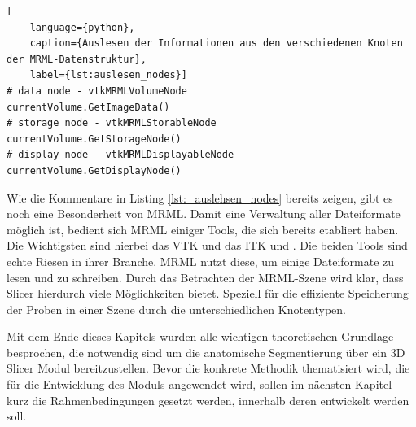 \pagebreak

\begin{lstlisting}[
	language={python},
	caption={Auslesen der Informationen aus den verschiedenen Knoten der MRML-Datenstruktur},
	label={lst:auslesen_nodes}]
# data node - vtkMRMLVolumeNode
currentVolume.GetImageData()
# storage node - vtkMRMLStorableNode
currentVolume.GetStorageNode()
# display node - vtkMRMLDisplayableNode
currentVolume.GetDisplayNode()
\end{lstlisting}

Wie die Kommentare in Listing \ref{lst:_auslehsen_nodes} bereits zeigen, gibt es
noch eine Besonderheit von \ac{MRML}. Damit eine Verwaltung aller Dateiformate
möglich ist, bedient sich \ac{MRML} einiger Tools, die sich bereits etabliert haben.
Die Wichtigsten sind hierbei das \ac{VTK} und das \ac{ITK} \citep[vgl.][K.~1.1]{vtk2006}
und \citep[vgl.][K.~1.1]{itkguide2015}. Die beiden Tools sind echte Riesen in ihrer
Branche. \ac{MRML} nutzt diese, um einige Dateiformate zu lesen und zu schreiben.
Durch das Betrachten der \ac{MRML}-Szene wird klar, dass Slicer hierdurch viele Möglichkeiten
bietet. Speziell für die effiziente Speicherung der Proben in einer Szene durch
die unterschiedlichen Knotentypen.

Mit dem Ende dieses Kapitels wurden alle wichtigen theoretischen Grundlage
besprochen, die notwendig sind um die anatomische Segmentierung über ein 3D Slicer
Modul bereitzustellen. Bevor die konkrete Methodik thematisiert wird, die für die
Entwicklung des Moduls angewendet wird, sollen im nächsten Kapitel kurz die
Rahmenbedingungen gesetzt werden, innerhalb deren entwickelt werden soll.
